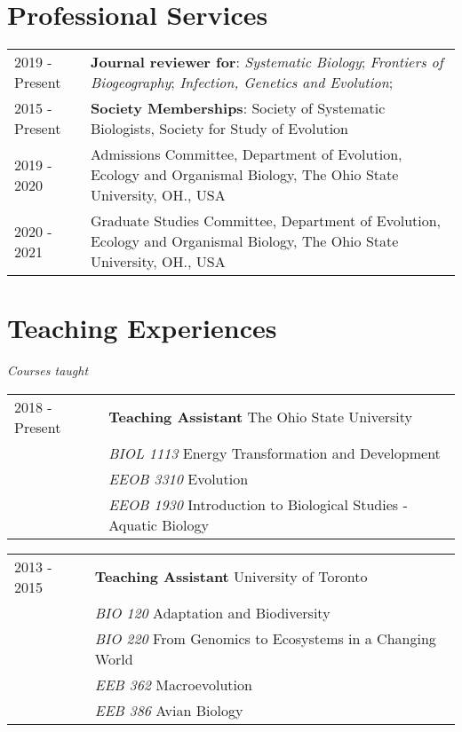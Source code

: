 \documentclass[11pt]{article}
\begin{document}
\hspace{0pt}
\section*{Professional Services}
\begin{longtable}{p{}  p{}}

2019 - Present &	\textbf{Journal reviewer for}: \textit{Systematic Biology}; \textit{Frontiers of Biogeography}; \textit{Infection, Genetics and Evolution};\\
2015 - Present &  \textbf{Society Memberships}: Society of Systematic Biologists, Society for Study of Evolution\\
2019 - 2020 &	Admissions Committee, Department of Evolution, Ecology and Organismal Biology, The Ohio State University, OH., USA\\
2020 - 2021 &  Graduate Studies Committee, Department of Evolution, Ecology and Organismal Biology, The Ohio State University, OH., USA

\end{longtable}

\hspace{0pt}
\section*{Teaching Experiences}
\textit{Courses taught}

\begin{longtable}{p{}  p{}}

2018 - Present & \textbf{Teaching Assistant} The Ohio State University\\
 & \textit{BIOL 1113} Energy Transformation and Development\\
& \textit{EEOB 3310} Evolution\\
& \textit{EEOB 1930} Introduction to Biological Studies - Aquatic Biology\\

\end{longtable}



\begin{longtable}{p{}  p{}}

2013 - 2015 & \textbf{Teaching Assistant} University of Toronto\\
 & \textit{BIO 120} Adaptation and Biodiversity\\
 & \textit{BIO 220} From Genomics to Ecosystems in a Changing World\\
& \textit{EEB 362} Macroevolution\\
& \textit{EEB 386} Avian Biology\\

\end{longtable}
\end{document}
